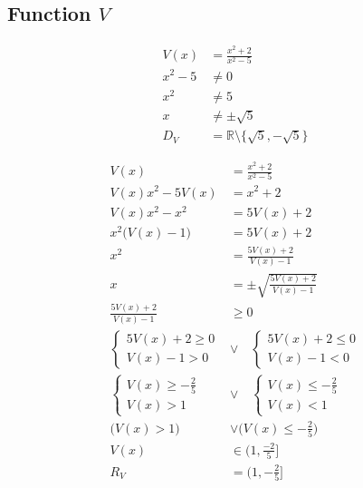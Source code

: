 \documentclass[12pt, letterpaper]{article}
\begin{document}
        \subsection{Function \(V\)}
        \vspace{-2pt}
        \begin{minipage}{0.5\textwidth}
            \begin{align*}
                V(x) &= \frac{x^2+2}{x^2-5} \\
                x^2 - 5 &\neq 0 \\
                x^2 &\neq 5 \\
                x &\neq \pm\sqrt{5} \\
                D_V &= \mathbb{R} \setminus \{\sqrt{5}, -\sqrt{5}\}
            \end{align*}
        \end{minipage}
        \begin{minipage}{0.5\textwidth}
            \begin{align*}
                V(x) &= \frac{x^2+2}{x^2-5} \\
                V(x)x^2 - 5V(x) &= x^2 + 2 \\
                V(x)x^2 - x^2 &= 5V(x) + 2 \\
                x^2 \Big(V(x)-1\Big) &= 5V(x)+2 \\
                x^2 &= \frac{5V(x) + 2}{V(x)-1} \\
                x &= \pm\sqrt{\frac{5V(x) + 2}{V(x)-1}} \\
                \frac{5V(x)+2}{V(x)-1} &\geq 0 \\
                \begin{cases}
                    5V(x)+2 \geq 0 \\
                    V(x)-1 > 0
                \end{cases} &\lor \quad
                \begin{cases}
                    5V(x)+2 \leq 0 \\
                    V(x)-1 < 0
                \end{cases} \\
                \begin{cases}
                    V(x) \geq -\frac{2}{5} \\
                    V(x) > 1
                \end{cases} &\lor \quad
                \begin{cases}
                    V(x) \leq -\frac{2}{5} \\
                    V(x) < 1
                \end{cases} \\
                \Big(V(x) > 1\Big) &\lor \Big(V(x) \leq -\frac{2}{5}\Big) \\
                V(x) &\in (1, \frac{-2}{5}] \\
                R_V &= (1, -\frac{2}{5}]
            \end{align*}
        \end{minipage}
\end{document}
